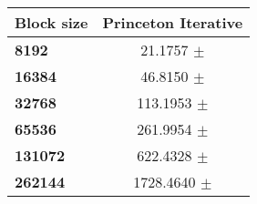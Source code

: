 \begin{tabular}{lc}\toprule
\textbf{Block size}  & \textbf{Princeton Iterative}\\\midrule
\textbf{8192}  & 21.1757 $\pm$ \\
\textbf{16384}  & 46.8150 $\pm$ \\
\textbf{32768}  & 113.1953 $\pm$ \\
\textbf{65536}  & 261.9954 $\pm$ \\
\textbf{131072}  & 622.4328 $\pm$ \\
\textbf{262144} & 1728.4640 $\pm$ \\
\bottomrule
\end{tabular}
